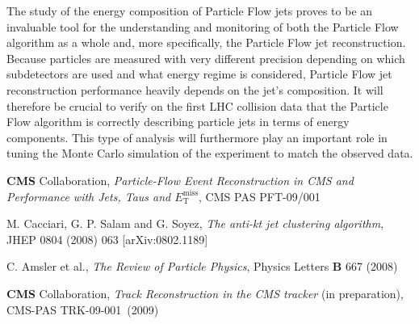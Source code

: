 \documentclass{cmspaper}
\begin{document}
The study of the energy composition of Particle Flow jets proves to be an invaluable tool for the understanding and monitoring of both the Particle Flow algorithm as a whole and, more specifically, the Particle Flow jet reconstruction. Because particles are measured with very different precision depending on which subdetectors are used and what energy regime is considered, Particle Flow jet reconstruction performance heavily depends on the jet's composition. It will therefore be crucial to verify on the first LHC collision data that the Particle Flow algorithm is correctly describing particle jets in terms of energy components. This type of analysis will furthermore play an important role in tuning the Monte Carlo simulation of the experiment to match the observed data.






\begin{thebibliography}{99}


 {\bf CMS} Collaboration, {\em Particle-Flow Event Reconstruction in CMS and Performance with Jets, Taus and $E_{\mathrm{T}}^{\mathrm{miss}}$}, CMS PAS PFT-09/001

 M. Cacciari, G. P. Salam and G. Soyez, {\em The anti-kt jet clustering algorithm}, JHEP 0804 (2008) 063 [arXiv:0802.1189]

 C. Amsler et al., {\em The Review of Particle Physics}, Physics Letters {\bf B} 667 (2008)

 {\bf CMS} Collaboration, {\em Track Reconstruction in the CMS tracker} (in preparation), CMS-PAS TRK-09-001~(2009)

\end{thebibliography}
%
%
%
%
%
%
%
%
%
\end{document}
